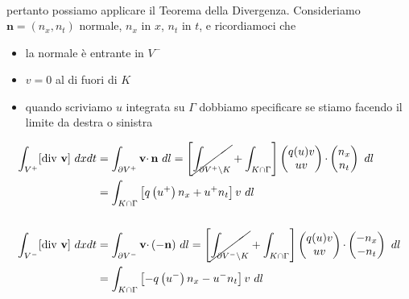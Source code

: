 \documentclass[10pt,a4paper,twoside,openright]{book}
\begin{document}
\begin{dimostrazione}
\begin{gather*}
	\end{gather*}
	pertanto possiamo applicare il Teorema della Divergenza. Consideriamo $\mathbf{n} =( n_{x} ,n_{t})$ normale, $n_{x}$ in $x$, $n_{t}$ in $t$, e ricordiamoci che
	\begin{itemize}
		\item la normale è entrante in $V^{-}$
		\item $v=0$ al di fuori di $K$
		\item quando scriviamo $u$ integrata su $\Gamma $ dobbiamo specificare se stiamo facendo il limite da destra o sinistra
	\end{itemize}
	\begin{align*}
		\int _{V^{+}}[\mathrm{div} \ \mathbf{v}] \ dxdt & =\int _{\partial V^{+}}\mathbf{v} \cdotp \mathbf{n} \ dl=\left[\cancel{\int _{\partial V^{+} \setminus K}} +\int _{K\cap \Gamma }\right]     
		\begin{pmatrix}
		q( u) v\\
		uv
		\end{pmatrix} \cdotp 
		\begin{pmatrix}
		n_{x}\\
		n_{t}
		\end{pmatrix} \ dl\\
		                                                & =\int _{K\cap \Gamma }\left[ q\left( u^{+}\right) n_{x} +u^{+} n_{t}\right] v\ dl                                                            \\
		                                                &                                                                                                                                              \\
		\int _{V^{-}}[\mathrm{div} \ \mathbf{v}] \ dxdt & =\int _{\partial V^{-}}\mathbf{v} \cdotp ( -\mathbf{n}) \ dl=\left[\cancel{\int _{\partial V^{-} \setminus K}} +\int _{K\cap \Gamma }\right] 
		\begin{pmatrix}
		q( u) v\\
		uv
		\end{pmatrix} \cdotp 
		\begin{pmatrix}
		-n_{x}\\
		-n_{t}
		\end{pmatrix} \ dl\\
		                                                & =\int _{K\cap \Gamma }\left[ -q\left( u^{-}\right) n_{x} -u^{-} n_{t}\right] v\ dl                                                           
	\end{align*}

\end{dimostrazione}
\end{document}
